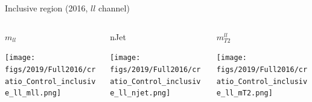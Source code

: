 \documentclass[9pt]{beamer}
\begin{document}
\begin{frame}{Inclusive region (2016, $ll$ channel)}
\begin{columns}
		\begin{column}{0.32\textwidth}
			\begin{center}
			\begin{block}{\centering $m_{ll}$}\end{block}	
     			\texttt{[image: figs/2019/Full2016/cratio\_Control\_inclusive\_ll\_mll.png]}
    		\end{center}		
		\end{column} \hfill
		\begin{column}{0.32\textwidth}
			\begin{center}
				\begin{block}{\centering nJet}\end{block}
     			\texttt{[image: figs/2019/Full2016/cratio\_Control\_inclusive\_ll\_njet.png]}
    		\end{center}		
		\end{column} \hfill
		\begin{column}{0.32\textwidth}
			\begin{center}
				\begin{block}{\centering $m_{T2}^{ll}$}\end{block}
     			\texttt{[image: figs/2019/Full2016/cratio\_Control\_inclusive\_ll\_mT2.png]}
   			 \end{center}
		\end{column} \hfill
	\end{columns}
\end{frame}
\end{document}
